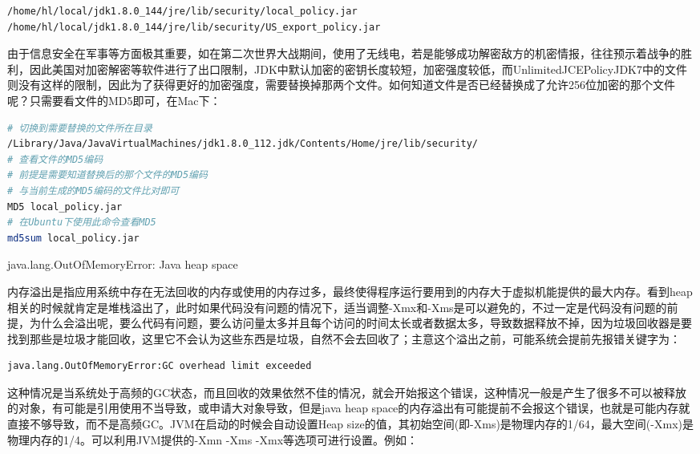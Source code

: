 \documentclass[12pt]{book}
\makeatletter
\numberwithin{dummy}{section}
\theoremstyle{ocrenumbox}
\theoremstyle{blacknumex}
\theoremstyle{blacknumbox}
\theoremstyle{ocrenum}
\renewcommand{\subsection}{\@startsection {subsection}{2}{\z@}
	{-3ex \@plus -0.1ex \@minus -.4ex}
	{0.5ex \@plus.2ex }
	{\normalfont\sffamily\bfseries}}
\makeatother
\begin{document}
\begin{lstlisting}[language=Bash]
/home/hl/local/jdk1.8.0_144/jre/lib/security/local_policy.jar
/home/hl/local/jdk1.8.0_144/jre/lib/security/US_export_policy.jar
\end{lstlisting}

由于信息安全在军事等方面极其重要，如在第二次世界大战期间，使用了无线电，若是能够成功解密敌方的机密情报，往往预示着战争的胜利，因此美国对加密解密等软件进行了出口限制，JDK中默认加密的密钥长度较短，加密强度较低，而UnlimitedJCEPolicyJDK7中的文件则没有这样的限制，因此为了获得更好的加密强度，需要替换掉那两个文件。如何知道文件是否已经替换成了允许256位加密的那个文件呢？只需要看文件的MD5即可，在Mac下：

\begin{lstlisting}[language=Bash]
# 切换到需要替换的文件所在目录
/Library/Java/JavaVirtualMachines/jdk1.8.0_112.jdk/Contents/Home/jre/lib/security/
# 查看文件的MD5编码
# 前提是需要知道替换后的那个文件的MD5编码
# 与当前生成的MD5编码的文件比对即可
MD5 local_policy.jar
# 在Ubuntu下使用此命令查看MD5
md5sum local_policy.jar
\end{lstlisting}

\subsection{java.lang.OutOfMemoryError: Java heap space	}

内存溢出是指应用系统中存在无法回收的内存或使用的内存过多，最终使得程序运行要用到的内存大于虚拟机能提供的最大内存。看到heap相关的时候就肯定是堆栈溢出了，此时如果代码没有问题的情况下，适当调整-Xmx和-Xms是可以避免的，不过一定是代码没有问题的前提，为什么会溢出呢，要么代码有问题，要么访问量太多并且每个访问的时间太长或者数据太多，导致数据释放不掉，因为垃圾回收器是要找到那些是垃圾才能回收，这里它不会认为这些东西是垃圾，自然不会去回收了；主意这个溢出之前，可能系统会提前先报错关键字为：

\begin{lstlisting}
java.lang.OutOfMemoryError:GC overhead limit exceeded
\end{lstlisting}

这种情况是当系统处于高频的GC状态，而且回收的效果依然不佳的情况，就会开始报这个错误，这种情况一般是产生了很多不可以被释放的对象，有可能是引用使用不当导致，或申请大对象导致，但是java heap space的内存溢出有可能提前不会报这个错误，也就是可能内存就直接不够导致，而不是高频GC。JVM在启动的时候会自动设置Heap size的值，其初始空间(即-Xms)是物理内存的1/64，最大空间(-Xmx)是物理内存的1/4。可以利用JVM提供的-Xmn -Xms -Xmx等选项可进行设置。例如：
\end{document}
